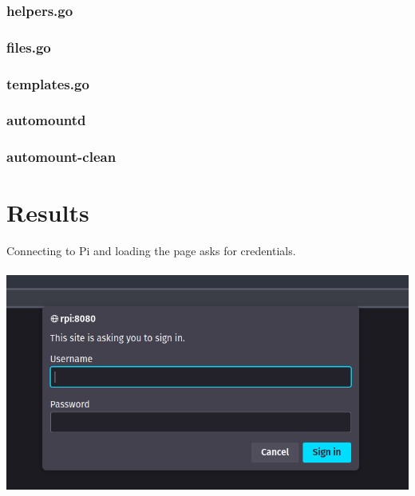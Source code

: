 \documentclass[12pt]{article}
\begin{document}
\subsubsection{helpers.go}


\subsubsection{files.go}


\subsubsection{templates.go}


\lstset{language=Bash}

\subsubsection{automountd}


\subsubsection{automount-clean}



\fi  %


\iftrue  %

\section{Results}

Connecting to Pi and loading the page asks for credentials. \\ \\
\includegraphics[width=\linewidth]{ss/1.cm-login.png} \\ \\
\end{document}
